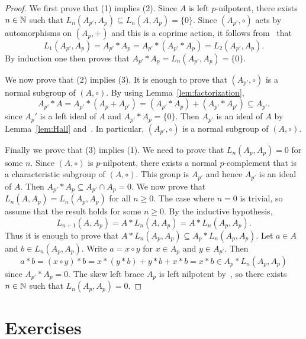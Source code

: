 \begin{proof}
    We first prove that (1) implies (2). Since $A$ is left $p$-nilpotent,
    there exists $n\in\mathbb{N}$ such that 
    $L_n(A_{p'},A_p)\subseteq L_n(A,A_p)=\{0\}$.
    Since $(A_{p'},\circ)$ acts by automorphisms on $(A_{p},+)$ and this is a coprime action, it follows from~\cite[Lemma 4.29]{MR2426855} that 
    \[
    L_1(A_{p'},A_p)=A_{p'}*A_p=A_{p'}*(A_{p'}*A_p)=L_2(A_{p'},A_p).
    \]
    By induction one then proves that $A_{p'}*A_p=L_n(A_{p'},A_p)=\{0\}$.
    
    We now prove that (2) implies (3). It is enough to prove that $(A_{p'},\circ)$ 
    is a normal subgroup of $(A,\circ)$. By using Lemma~\ref{lem:factorization},  
    \[
    A_{p'}*A=A_{p'}*(A_p+A_{p'})=(A_{p'}*A_p)+(A_{p'}*A_{p'})\subseteq A_{p'}.
    \]
    since $A_p'$ is a left ideal of $A$ and $A_{p'}*A_p=\{0\}$. Then 
    $A_{p'}$ is an ideal of $A$ by Lemma~\ref{lem:Hall} and~\cite[Lemma 1.9]{csv}. In particular, $(A_{p'},\circ)$ is a normal subgroup of $(A,\circ)$. 
    
    Finally we prove that (3) implies (1). We need to prove that $L_n(A_p,A_p)=0$ for some $n$. Since $(A,\circ)$ is $p$-nilpotent, 
    there exists a normal $p$-complement that is a characteristic subgroup of $(A,\circ)$. This group is $A_{p'}$ and hence $A_{p'}$ is an ideal of $A$. Then
    $A_{p'}*A_p\subseteq A_{p'}\cap A_p=0$. We now prove that
    $L_n(A,A_p)=L_n(A_p,A_p)$ for all $n\geq0$. The case where $n=0$ is trivial, so assume that the result holds for some $n\geq0$. By the inductive hypothesis,
    \[
    L_{n+1}(A,A_p)=A*L_n(A,A_p)=A*L_n(A_p,A_p).
    \]
    Thus it is enough to prove that $A*L_n(A_p,A_p)\subseteq A_p*L_n(A_p,A_p)$. Let $a\in A$ and $b\in L_n(A_p,A_p)$. Write $a=x\circ y$ for $x\in A_p$ and $y\in A_{p'}$. Then
    \[
    a*b=(x\circ y)*b=x*(y*b)+y*b+x*b=x*b\in A_p*L_n(A_p,A_p)
    \]
    since $A_{p'}*A_p=0$. The skew left brace $A_p$ is left nilpotent
    by~\cite[Proposition 4.4]{csv}, so there exists $n\in\mathbb{N}$ such that $L_n(A_p,A_p)=0$.
\end{proof}


\section*{Exercises}

